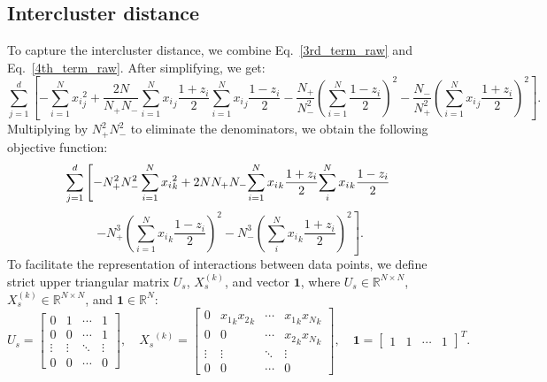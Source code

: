 \documentclass[showpacs,twocolumn,superscriptaddress]{revtex4-2}
\begin{document}
\subsection{Intercluster distance}
\label{sec:Appendix_A2}
To capture the intercluster distance, we combine Eq.~\eqref{3rd_term_raw} and Eq.~\eqref{4th_term_raw}. After simplifying, we get:
\begin{equation}
    \sum_{j=1}^d \left[-\sum_{i=1}^N {x_i}_j^2 + \frac{2N}{N_+ N_-} \sum_{i=1}^N {x_i}_j \frac{1+z_i}{2} \sum_{i=1}^N {x_i}_j \frac{1-z_i}{2} - \frac{N_+}{N_-^2} \left(\sum_{i=1}^N \frac{1-z_i}{2}\right)^2 - \frac{N_-}{N_+^2}\left(\sum_{i=1}^N {x_i}_j \frac{1+z_i}{2}\right)^2\right].
\end{equation}
Multiplying by $N_+^2N_-^2$ to eliminate the denominators, we obtain the following objective function:
\begin{equation}
    \sum_{j=1}^d \left[-{N_{+}^2N_{-}^2}\sum_{i=1}^{N}{{x_i}_k^2} + 2NN_{+}N_{-}{\sum_{i=1}^{N}{x_i}_k \frac{1+z_i}{2}}{\sum_{i}^{N}{x_i}_k \frac{1-z_i}{2}} \right.\nonumber\\
\end{equation}
\begin{equation}
    \left.- {N_{+}^3}\left(\sum_{i=1}^{N}{x_i}_k \frac{1-z_i}{2}\right)^2 - {N_{-}^3}\left(\sum_{i}^{N}{x_i}_k \frac{1+z_i}{2}\right)^2\right].
\end{equation}
To facilitate the representation of interactions between data points, we define strict upper triangular matrix $U_s$, $X_s^{(k)}$, and vector $\mathbf{1}$, where $U_s \in \mathbb{R}^{N\times N}$, $X_s^{(k)} \in \mathbb{R}^{N \times N}$, and $\mathbf{1}\in \mathbb{R}^N$:
\begin{equation}
            U_s = 
    \begin{bmatrix}
    0 & 1 & \cdots & 1 \\
    0 & 0 & \cdots & 1 \\
    \vdots  & \vdots  & \ddots & \vdots  \\
    0 & 0 & \cdots & 0
    \end{bmatrix}, \quad
    {X_s}^{(k)} = 
    \begin{bmatrix}
    0 & {x_1}_k{x_2}_k & \cdots & {x_1}_k{x_N}_k \\
    0 & 0 & \cdots & {x_2}_k{x_N}_k \\
    \vdots  & \vdots  & \ddots & \vdots  \\
    0 & 0 & \cdots & 0
    \end{bmatrix}, \quad
    \mathbf{1}=
    \begin{bmatrix}
    1 & 1 & \cdots & 1
    \end{bmatrix}^T.
\end{equation}
\end{document}
